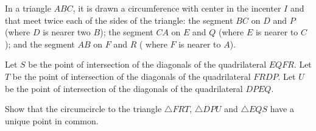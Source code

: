 In a triangle $ABC$,  it is drawn a circumference with center in the incenter $I$ and that meet twice each of the sides of the triangle: the segment $BC$ on $D$ and $P$ (where $D$ is nearer two $B$); the segment $CA$ on $E$ and $Q$ (where $E$ is nearer to $C$); and the segment $AB$ on $F$ and $R$ ( where $F$ is nearer to $A$).

Let $S$ be the point of intersection of the diagonals of the quadrilateral $EQFR$. Let $T$ be the point of intersection of the diagonals of the quadrilateral $FRDP$. Let $U$ be the point of intersection of the diagonals of the quadrilateral $DPEQ$.

Show that the circumcircle to the triangle $\triangle{FRT}$,  $\triangle{DPU}$ and $\triangle{EQS}$ have a unique point in common.